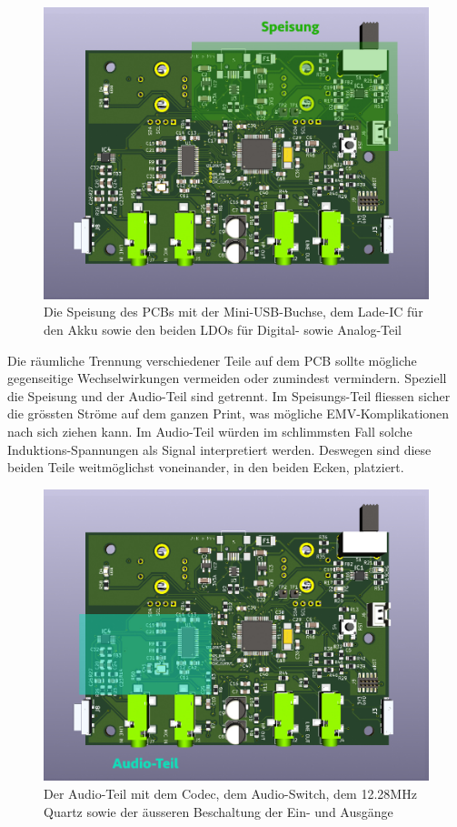 \begin{figure} [H]
\begin{center}
 \includegraphics[scale=0.37]{../graphics/PCB-Layout_PWR.jpg}
 \caption{Die Speisung des PCBs mit der Mini-USB-Buchse, dem Lade-IC für den Akku sowie den beiden LDOs für Digital- sowie Analog-Teil}
\label{fig:PCB_PWR}
\end{center}
\end{figure}

Die räumliche Trennung verschiedener Teile auf dem PCB sollte mögliche gegenseitige Wechselwirkungen vermeiden oder zumindest vermindern. Speziell die Speisung und der Audio-Teil sind getrennt. Im Speisungs-Teil fliessen sicher die grössten Ströme auf dem ganzen Print, was mögliche EMV-Komplikationen nach sich ziehen kann. Im Audio-Teil würden im schlimmsten Fall solche Induktions-Spannungen als Signal interpretiert werden. Deswegen sind diese beiden Teile weitmöglichst voneinander, in den beiden Ecken, platziert.

\begin{figure} [H]
\begin{center}
 \includegraphics[scale=0.37]{../graphics/PCB-Layout_AUDIO.jpg}
 \caption{Der Audio-Teil mit dem Codec, dem Audio-Switch, dem 12.28MHz Quartz sowie der äusseren Beschaltung der Ein- und Ausgänge}
\label{fig:PCB_AUDIO}
\end{center}
\end{figure}

